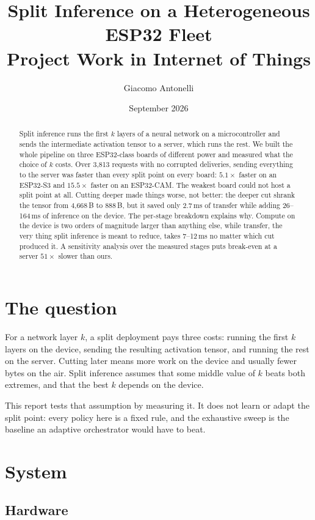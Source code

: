\documentclass[11pt,a4paper]{article}
\title{\textbf{Split Inference on a Heterogeneous ESP32 Fleet}\\[0.3em]
\large Project Work in Internet of Things}
\author{Giacomo Antonelli}
\date{September 2026}
\begin{document}
\maketitle

\begin{abstract}
\noindent
Split inference runs the first $k$ layers of a neural network on a
microcontroller and sends the intermediate activation tensor to a server, which
runs the rest. We built the whole pipeline on three ESP32-class boards of
different power and measured what the choice of $k$ costs. Over 3{,}813 requests
with no corrupted deliveries, sending everything to the server was faster than
every split point on every board: $5.1\times$ faster on an ESP32-S3 and
$15.5\times$ faster on an ESP32-CAM. The weakest board could not host a split
point at all. Cutting deeper made things worse, not better: the deeper cut
shrank the tensor from 4{,}668\,B to 888\,B, but it saved only 2.7\,ms of
transfer while adding 26--164\,ms of inference on the device. The per-stage
breakdown explains why. Compute on the device is two orders of magnitude larger
than anything else, while transfer, the very thing split inference is meant to
reduce, takes 7--12\,ms no matter which cut produced it. A sensitivity analysis
over the measured stages puts break-even at a server $51\times$ slower than
ours.
\end{abstract}

\section{The question}

For a network layer $k$, a split deployment pays three costs: running the first
$k$ layers on the device, sending the resulting activation tensor, and running
the rest on the server. Cutting later means more work on the device and usually
fewer bytes on the air. Split inference assumes that some middle value of $k$
beats both extremes, and that the best $k$ depends on the device.

This report tests that assumption by measuring it. It does not learn or adapt
the split point: every policy here is a fixed rule, and the exhaustive sweep is
the baseline an adaptive orchestrator would have to beat.

\section{System}

\subsection{Hardware}
\end{document}
